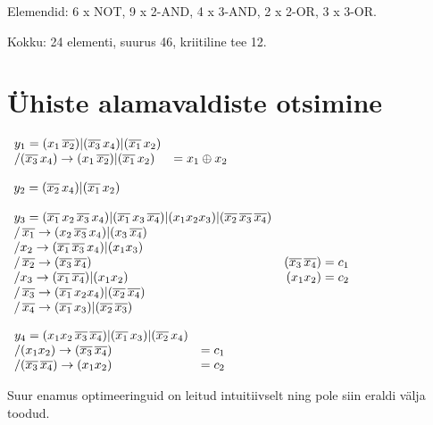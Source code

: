 Elemendid: 6 x NOT, 9 x 2-AND, 4 x 3-AND, 2 x 2-OR, 3 x 3-OR.

Kokku: 24 elementi, suurus 46, kriitiline tee 12.

\section{Ühiste alamavaldiste otsimine}

\(\begin{array}{l r}
y_1 = (x_1 \mathop{\overline{x_2}}) | (\mathop{\overline{x_3}} x_4) | (\mathop{\overline{x_1}} x_2)\\
/(\mathop{\overline{x_3}} x_4) \rightarrow (x_1 \mathop{\overline{x_2}}) |  (\mathop{\overline{x_1}} x_2) & = x_1  \oplus  x_2 \\ 
\end{array}\)

\(\begin{array}{l r}
y_2 = (\mathop{\overline{x_2}} x_4) | (\mathop{\overline{x_1}} x_ 2)
\end{array}\)

\(\begin{array}{l r}
y_3 = (\mathop{\overline{x_1}} x_2 \mathop{\overline{x_3}} x_4) | (\mathop{\overline{x_1}} x_3 \mathop{\overline{x_4}}) |
    (x_1 x_2 x_3) | (\mathop{\overline{x_2}} \mathop{\overline{x_3}} \mathop{\overline{x_4}}) \\
/\mathop{\overline{x_1}} \rightarrow (x_2 \mathop{\overline{x_3}} x_4) | (x_3 \mathop{\overline{x_4}}) \\
/x_2 \rightarrow (\mathop{\overline{x_1}} \mathop{\overline{x_3}} x_4) | (x_1 x_3) \\
/\mathop{\overline{x_2}} \rightarrow (\mathop{\overline{x_3}} \mathop{\overline{x_4}}) & (\mathop{\overline{x_3}} \mathop{\overline{x_4}}) = c_1 \\
/x_3 \rightarrow (\mathop{\overline{x_1}} \mathop{\overline{x_4}}) | (x_1 x_2) & (x_1 x_2) = c_2\\
/\mathop{\overline{x_3}} \rightarrow (\mathop{\overline{x_1}} x_2 x_4) | (\mathop{\overline{x_2}} \mathop{\overline{x_4}})\\
/\mathop{\overline{x_4}} \rightarrow (\mathop{\overline{x_1}} x_3) | (\mathop{\overline{x_2}} \mathop{\overline{x_3}})

\end{array}\)

\(\begin{array}{l r}
y_4 = (x_1 x_2 \mathop{\overline{x_3}} \mathop{\overline{x_4}}) | (\mathop{\overline{x_1}} x_3) | (\mathop{\overline{x_2}} x_4) \\
/(x_1 x_2) \rightarrow (\mathop{\overline{x_3}} \mathop{\overline{x_4}}) & = c_1 \\
/(\mathop{\overline{x_3}} \mathop{\overline{x_4}}) \rightarrow (x_1 x_2) & = c_2 \\
\end{array}\)

Suur enamus optimeeringuid on leitud intuitiivselt ning pole siin eraldi välja toodud.


